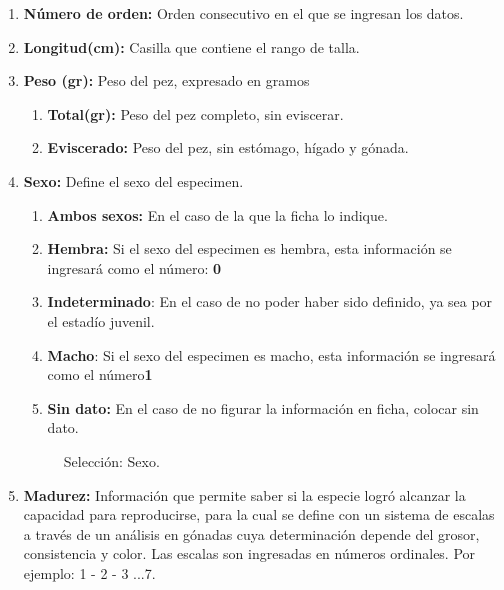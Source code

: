\documentclass[a4paper,oneside,11pt]{book}
\begin{document}
\begin{itemize}
\begin{enumerate}
\item \textbf{Número de orden:} Orden consecutivo en el que se ingresan los datos.
\item \textbf{Longitud(cm):} Casilla que contiene el rango de talla. 
\item \textbf{Peso (gr):} Peso del pez, expresado en gramos 
\begin{enumerate}
\item \textbf{Total(gr):} Peso del pez completo, sin eviscerar.
\item \textbf{Eviscerado:} Peso del pez, sin estómago, hígado y gónada.
\end{enumerate}
\item \textbf{Sexo:} Define el sexo del especimen.
\begin{enumerate}
 \item\textbf{{Ambos sexos:}} En el caso de la que la ficha lo indique.
 \item{\textbf{Hembra:}} Si el sexo del especimen es hembra, esta información se ingresará como el número: \textbf{0}
 \item \textbf{Indeterminado}: En el caso de no poder haber sido definido, ya sea por el estadío juvenil.
 \item \textbf{Macho}: Si el sexo del especimen es macho, esta información se ingresará como el número\textbf{1}
 \item \textbf{Sin dato:} En el caso de no figurar la información en ficha, colocar sin dato.
 \end{enumerate}


\begin{figure} [!h]
\begin{center}
\caption{Selección: Sexo.}
\end{center}
\end{figure}


\item \textbf{Madurez:} Información que permite saber si la especie logró alcanzar la capacidad para reproducirse, para la cual se define con un sistema de escalas a través de un análisis en gónadas cuya determinación depende del grosor, consistencia y color. Las escalas son ingresadas en números ordinales. Por ejemplo: 1 - 2 - 3 ...7.


\end{enumerate}
\end{itemize}
\end{document}
